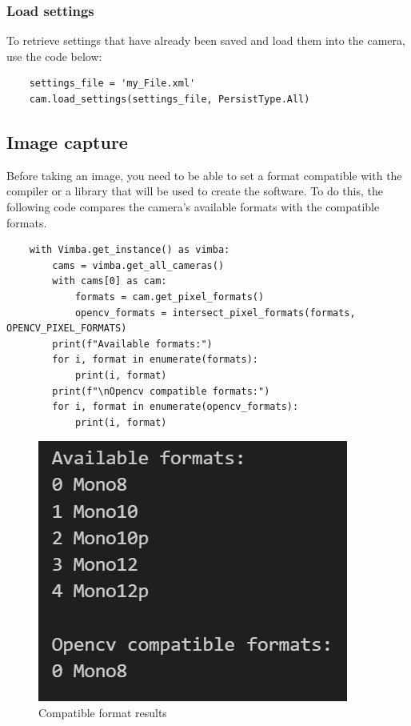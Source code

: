 \subsubsection{Load settings}
To retrieve settings that have already been saved and load them into the camera, use the code below:
\begin{verbatim}
    settings_file = 'my_File.xml'
    cam.load_settings(settings_file, PersistType.All)
\end{verbatim}
\newpage
\subsection{Image capture}
Before taking an image, you need to be able to set a format compatible with the compiler or 
a library that will be used to create the software. To do this, the following code compares 
the camera's available formats with the compatible formats.
\begin{verbatim}
    with Vimba.get_instance() as vimba:
        cams = vimba.get_all_cameras()
        with cams[0] as cam:
            formats = cam.get_pixel_formats()
            opencv_formats = intersect_pixel_formats(formats, OPENCV_PIXEL_FORMATS)
        print(f"Available formats:")
        for i, format in enumerate(formats):
            print(i, format)
        print(f"\nOpencv compatible formats:")
        for i, format in enumerate(opencv_formats):
            print(i, format)
\end{verbatim}
\begin{figure}[H]
    \centering
    \includegraphics[scale=0.85]{assets/figures/Software/Format_Available.png}
    \caption{Compatible format results}
    \label{fig:Soft_Vimba_Format}
\end{figure}
